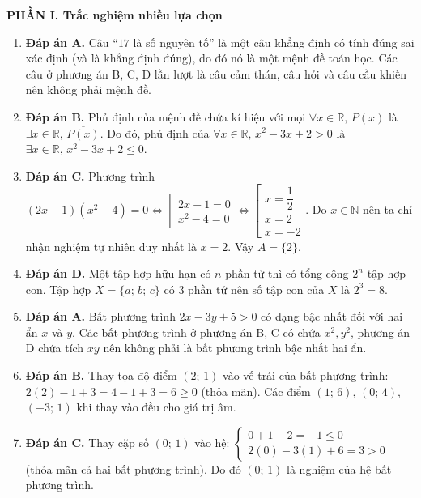 \documentclass[12pt,a4paper]{article}
\begin{document}
\textbf{\large PHẦN I. Trắc nghiệm nhiều lựa chọn}
\begin{enumerate}[label=\textbf{Câu \arabic*.},leftmargin=1.1cm]
\item \textbf{Đáp án A.}
Câu ``$17$ là số nguyên tố'' là một câu khẳng định có tính đúng sai xác định (và là khẳng định đúng), do đó nó là một mệnh đề toán học. Các câu ở phương án B, C, D lần lượt là câu cảm thán, câu hỏi và câu cầu khiến nên không phải mệnh đề.

\item \textbf{Đáp án B.}
Phủ định của mệnh đề chứa kí hiệu với mọi $\forall x \in \mathbb{R},\, P(x)$ là $\exists x \in \mathbb{R},\, \overline{P(x)}$. Do đó, phủ định của $\forall x \in \mathbb{R},\, x^2 - 3x + 2 > 0$ là $\exists x \in \mathbb{R},\, x^2 - 3x + 2 \le 0$.

\item \textbf{Đáp án C.}
Phương trình $(2x - 1)(x^2 - 4) = 0 \iff \left[\begin{array}{l} 2x - 1 = 0 \\ x^2 - 4 = 0 \end{array}\right. \iff \left[\begin{array}{l} x = \dfrac{1}{2} \\ x = 2 \\ x = -2 \end{array}\right.$.
Do $x \in \mathbb{N}$ nên ta chỉ nhận nghiệm tự nhiên duy nhất là $x = 2$. Vậy $A = \{2\}$.

\item \textbf{Đáp án D.}
Một tập hợp hữu hạn có $n$ phần tử thì có tổng cộng $2^n$ tập hợp con. Tập hợp $X = \{a;\, b;\, c\}$ có $3$ phần tử nên số tập con của $X$ là $2^3 = 8$.

\item \textbf{Đáp án A.}
Bất phương trình $2x - 3y + 5 > 0$ có dạng bậc nhất đối với hai ẩn $x$ và $y$. Các bất phương trình ở phương án B, C có chứa $x^2, y^2$, phương án D chứa tích $xy$ nên không phải là bất phương trình bậc nhất hai ẩn.

\item \textbf{Đáp án B.}
Thay tọa độ điểm $(2;\, 1)$ vào vế trái của bất phương trình:
$2(2) - 1 + 3 = 4 - 1 + 3 = 6 \ge 0$ (thỏa mãn).
Các điểm $(1;\, 6)$, $(0;\, 4)$, $(-3;\, 1)$ khi thay vào đều cho giá trị âm.

\item \textbf{Đáp án C.}
Thay cặp số $(0;\, 1)$ vào hệ:
$\begin{cases} 0 + 1 - 2 = -1 \le 0 \\ 2(0) - 3(1) + 6 = 3 > 0 \end{cases}$ (thỏa mãn cả hai bất phương trình).
Do đó $(0;\, 1)$ là nghiệm của hệ bất phương trình.


\end{enumerate}
\end{document}
